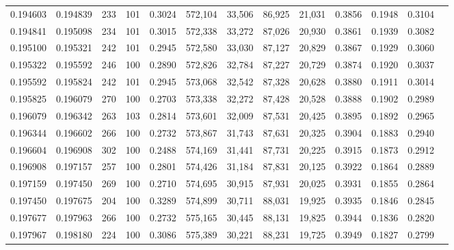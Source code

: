 \begin{tabular}{rrrrrrrrrrrrr}
0.194603 & 0.194839 &   233 & 101 &                                     0.3024 & 572,104 &  33,506 &  86,925 &  21,031 & 0.3856 & 0.1948 & 0.3104 \\
0.194841 & 0.195098 &   234 & 101 &                                     0.3015 & 572,338 &  33,272 &  87,026 &  20,930 & 0.3861 & 0.1939 & 0.3082 \\
0.195100 & 0.195321 &   242 & 101 &                                     0.2945 & 572,580 &  33,030 &  87,127 &  20,829 & 0.3867 & 0.1929 & 0.3060 \\
0.195322 & 0.195592 &   246 & 100 &                                     0.2890 & 572,826 &  32,784 &  87,227 &  20,729 & 0.3874 & 0.1920 & 0.3037 \\
0.195592 & 0.195824 &   242 & 101 &                                     0.2945 & 573,068 &  32,542 &  87,328 &  20,628 & 0.3880 & 0.1911 & 0.3014 \\
0.195825 & 0.196079 &   270 & 100 &                                     0.2703 & 573,338 &  32,272 &  87,428 &  20,528 & 0.3888 & 0.1902 & 0.2989 \\
0.196079 & 0.196342 &   263 & 103 &                                     0.2814 & 573,601 &  32,009 &  87,531 &  20,425 & 0.3895 & 0.1892 & 0.2965 \\
0.196344 & 0.196602 &   266 & 100 &                                     0.2732 & 573,867 &  31,743 &  87,631 &  20,325 & 0.3904 & 0.1883 & 0.2940 \\
0.196604 & 0.196908 &   302 & 100 &                                     0.2488 & 574,169 &  31,441 &  87,731 &  20,225 & 0.3915 & 0.1873 & 0.2912 \\
0.196908 & 0.197157 &   257 & 100 &                                     0.2801 & 574,426 &  31,184 &  87,831 &  20,125 & 0.3922 & 0.1864 & 0.2889 \\
0.197159 & 0.197450 &   269 & 100 &                                     0.2710 & 574,695 &  30,915 &  87,931 &  20,025 & 0.3931 & 0.1855 & 0.2864 \\
0.197450 & 0.197675 &   204 & 100 &                                     0.3289 & 574,899 &  30,711 &  88,031 &  19,925 & 0.3935 & 0.1846 & 0.2845 \\
0.197677 & 0.197963 &   266 & 100 &                                     0.2732 & 575,165 &  30,445 &  88,131 &  19,825 & 0.3944 & 0.1836 & 0.2820 \\
0.197967 & 0.198180 &   224 & 100 &                                     0.3086 & 575,389 &  30,221 &  88,231 &  19,725 & 0.3949 & 0.1827 & 0.2799 \\

\end{tabular}

